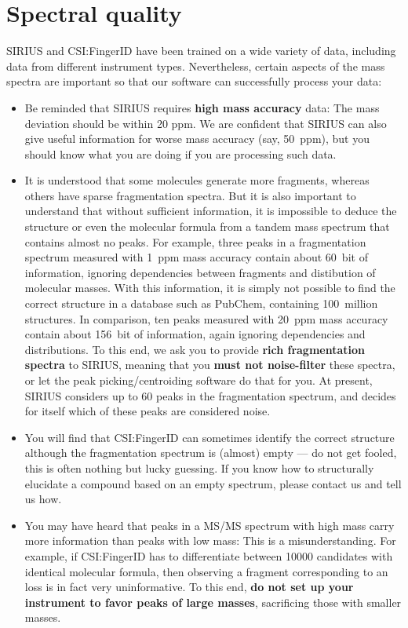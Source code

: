 \documentclass[letterpaper,10pt,openany,oneside]{sphinxmanual}
\begin{document}
\section{Spectral quality}

SIRIUS and CSI:FingerID have been trained on a wide variety of data,
including data from different instrument types.  Nevertheless, certain
aspects of the mass spectra are important so that our software can
successfully process your data:
%
\begin{itemize}
\item Be reminded that SIRIUS requires \textbf{high mass accuracy} data:
  The mass deviation should be within 20 ppm.  We are confident that
  SIRIUS can also give useful information for worse mass accuracy (say,
  50~ppm), but you should know what you are doing if you are processing such
  data.

\item It is understood that some molecules generate more fragments, whereas
  others have sparse fragmentation spectra.  But it is also important to
  understand that without sufficient information, it is impossible to deduce
  the structure or even the molecular formula from a tandem mass spectrum
  that contains almost no peaks.  For example, three peaks in a fragmentation
  spectrum measured with 1~ppm mass accuracy contain about 60~bit of
  information, ignoring dependencies between fragments and distibution of
  molecular masses.  With this information, it is simply not possible to find
  the correct structure in a database such as PubChem, containing 100~million
  structures.  In comparison, ten peaks measured with 20~ppm mass accuracy
  contain about 156~bit of information, again ignoring dependencies and
  distributions.  To this end, we ask you to provide \textbf{rich
  fragmentation spectra} to SIRIUS, meaning that you \textbf{must not
  noise-filter} these spectra, or let the peak picking/centroiding software
  do that for you.  At present, SIRIUS considers up to 60 peaks in the
  fragmentation spectrum, and decides for itself which of these peaks are
  considered noise.

\item You will find that CSI:FingerID can sometimes identify the correct
  structure although the fragmentation spectrum is (almost) empty --- do not
  get fooled, this is often nothing but lucky guessing.  If you know how to
  structurally elucidate a compound based on an empty spectrum, please
  contact us and tell us how.

\item You may have heard that peaks in a MS/MS spectrum with high mass
  carry more information than peaks with low mass: This is a
  misunderstanding.  For example, if CSI:FingerID has to differentiate
  between 10000 candidates with identical molecular formula, then observing a
  fragment corresponding to an  loss is in fact very uninformative.
  To this end, \textbf{do not set up your instrument to favor peaks of large
  masses}, sacrificing those with smaller masses.


\end{itemize}
\end{document}
